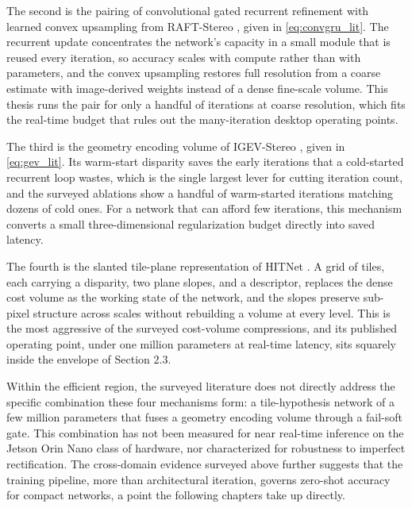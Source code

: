 The second is the pairing of convolutional gated recurrent refinement
with learned convex upsampling from RAFT-Stereo
\cite{lipson2021raftstereo}, given in \eqref{eq:convgru_lit}. The
recurrent update concentrates the network's capacity in a small module
that is reused every iteration, so accuracy scales with compute rather
than with parameters, and the convex upsampling restores full resolution
from a coarse estimate with image-derived weights instead of a dense
fine-scale volume. This thesis runs the pair for only a handful of
iterations at coarse resolution, which fits the real-time budget that
rules out the many-iteration desktop operating points.

The third is the geometry encoding volume of IGEV-Stereo
\cite{xu2023igev}, given in \eqref{eq:gev_lit}. Its warm-start disparity
saves the early iterations that a cold-started recurrent loop wastes,
which is the single largest lever for cutting iteration count, and the
surveyed ablations show a handful of warm-started iterations matching
dozens of cold ones. For a network that can afford few iterations, this
mechanism converts a small three-dimensional regularization budget
directly into saved latency.

The fourth is the slanted tile-plane representation of HITNet
\cite{tankovich2021hitnet}. A grid of tiles, each carrying a disparity,
two plane slopes, and a descriptor, replaces the dense cost volume as
the working state of the network, and the slopes preserve sub-pixel
structure across scales without rebuilding a volume at every level. This
is the most aggressive of the surveyed cost-volume compressions, and its
published operating point, under one million parameters at real-time
latency, sits squarely inside the envelope of Section 2.3.

Within the efficient region, the surveyed literature does not directly
address the specific combination these four mechanisms form: a
tile-hypothesis network of a few million parameters that fuses a
geometry encoding volume through a fail-soft gate. This combination has
not been measured for near real-time inference on the Jetson Orin Nano
class of hardware, nor characterized for robustness to imperfect
rectification. The cross-domain evidence surveyed above further suggests
that the training pipeline, more than architectural iteration, governs
zero-shot accuracy for compact networks, a point the following chapters
take up directly.

